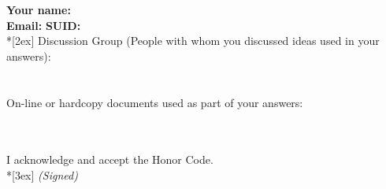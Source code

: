 \documentclass[11pt]{article}
\begin{document}
\vfill
\vfill

{\Large
\textbf{Your name:} \hrulefill \\
\textbf{Email:} \underline{\hspace*{7cm}} \textbf{SUID:} \hrulefill\\*[2ex] }
Discussion Group (People with whom you discussed ideas used in your answers): \\\\\\
On-line or hardcopy documents used as part of your answers: \\\\\\
\vfill

\vfill

I acknowledge and accept the Honor Code.\\*[3ex]
\bigskip
\textit{(Signed)}\hrulefill

\vfill
\vfill
\end{document}
